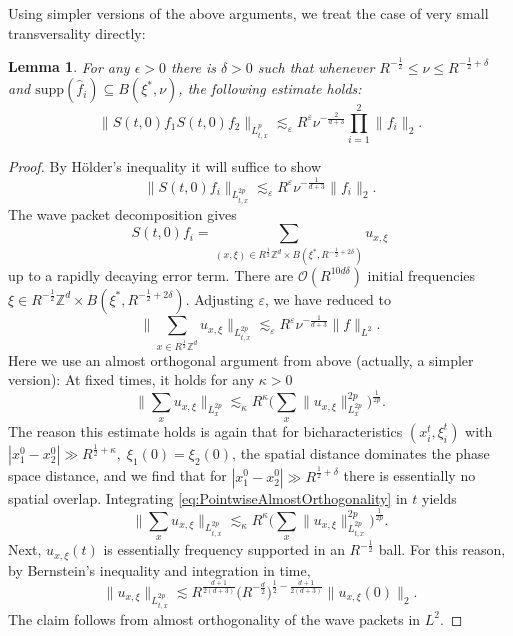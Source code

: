 \documentclass{amsart}
\newtheorem{lemma}[theorem]{Lemma}
\theoremstyle{definition}
\newcommand{\Z}{\mathbb{Z}}
\begin{document}
Using simpler versions of the above arguments, we treat the case of very small transversality directly:
\begin{lemma}
For any $\epsilon > 0$ there is $\delta > 0$ such that whenever $R^{-\frac{1}{2}} \leq \nu \leq R^{-\frac{1}{2}+\delta}$ and $\text{supp}(\hat{f}_i) \subseteq B(\xi^*,\nu)$, the following estimate holds:
\begin{equation*}
\| S(t,0) f_1 S(t,0) f_2 \|_{L^p_{t,x}} \lesssim_\varepsilon R^{\varepsilon} \nu^{-\frac{2}{d+3}} \prod_{i=1}^2 \| f_i \|_2.
\end{equation*}
\end{lemma}
\begin{proof}
 By H\"older's inequality it will suffice to show 
\begin{equation*}
\| S(t,0) f_i \|_{L^{2p}_{t,x}} \lesssim_\varepsilon R^{\varepsilon} \nu^{-\frac{1}{d+3}} \| f_i \|_2.
\end{equation*}
The wave packet decomposition gives
\begin{equation*}
S(t,0) f_i = \sum_{(x,\xi) \in R^{\frac{1}{2}} \Z^d \times B(\xi^*,R^{-\frac{1}{2}+2 \delta})} u_{x,\xi} 
\end{equation*}
up to a rapidly decaying error term. There are $\mathcal{O}(R^{10 d \delta})$ initial frequencies $\xi \in R^{-\frac{1}{2}} \Z^d \times B(\xi^*,R^{-\frac{1}{2}+2\delta})$.
Adjusting $\varepsilon$, we have reduced to
\begin{equation*}
\big\| \sum_{x \in R^{\frac{1}{2}} \Z^d} u_{x,\xi} \big\|_{L^{2p}_{t,x}} \lesssim_{\varepsilon} R^{\varepsilon} \nu^{-\frac{1}{d+3}} \| f \|_{L^2}.
\end{equation*}
Here we use an almost orthogonal argument from above (actually, a simpler version): At fixed times, it holds for any $\kappa > 0$
\begin{equation}
\label{eq:PointwiseAlmostOrthogonality}
\big\| \sum_x u_{x,\xi} \big\|_{L^{2p}_x} \lesssim_{\kappa} R^{\kappa} \big( \sum_x \|u_{x,\xi} \|_{L^{2p}_x}^{2p} \big)^{\frac{1}{2p}}.
\end{equation}
The reason this estimate holds is again that for bicharacteristics $(x_i^t,\xi_i^t)$ with $ |x_1^0 - x_2^0| \gg R^{\frac{1}{2}+\kappa}, \; \xi_1(0) = \xi_2(0) $, the spatial distance dominates the phase space distance, and we find that  for $|x_1^0 - x_2^0| \gg R^{\frac{1}{2}+\delta}$ there is  essentially no spatial overlap. Integrating \eqref{eq:PointwiseAlmostOrthogonality} in $t$ yields
\begin{equation*}
\big\| \sum_x u_{x,\xi} \big\|_{L^{2p}_{t,x}} \lesssim_{\kappa} R^{\kappa} \big( \sum_x \|u_{x,\xi} \|_{L^{2p}_{t,x}}^{2p} \big)^{\frac{1}{2p}}.
\end{equation*}
Next, $u_{x,\xi}(t)$ is essentially frequency supported in an $R^{-\frac{1}{2}}$ ball. For this reason, by Bernstein's inequality and integration in time, 
\begin{equation*}
\| u_{x,\xi} \|_{L^{2p}_{t,x}} \lesssim R^{\frac{d+1}{2(d+3)}} \big( R^{-\frac{d}{2}} \big)^{\frac{1}{2}-\frac{d+1}{2(d+3)}} \| u_{x,\xi}(0) \|_2.
\end{equation*}
The claim follows from almost orthogonality of the wave packets in $L^2$.
\end{proof}
\end{document}
